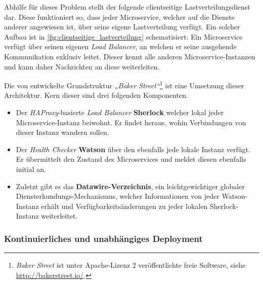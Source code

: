 Abhilfe für dieses Problem stellt der folgende clientseitige Lastverteilungsdienst dar. Diese funktioniert so, dass jeder Microservice, welcher auf die Dienste anderer angewiesen ist, über seine eigene Lastverteilung verfügt. Ein solcher Aufbau ist in \autoref{fig:clientseitige_lastverteilung} schematisiert: Ein Microservice verfügt über seinen eigenen \textit{Load Balancer}, an welchen er seine ausgehende Kommunikation exklusiv leitet. Dieser kennt alle anderen Microservice-Instanzen und kann daher Nachrichten an diese weiterleiten.

Die von \citeauthor{Li15} entwickelte Grundstruktur \textit{„Baker Street“}\footnote{\textit{Baker Street} ist unter Apache-Lizenz 2 veröffentlichte freie Software, siehe \url{http://bakerstreet.io/}.} ist eine Umsetzung dieser Architektur. Kern dieser sind drei folgenden Komponenten.

\begin{itemize}
	\item Der \textit{HAProxy}-basierte \textit{Load Balancer} \textbf{Sherlock} welcher lokal jeder Microservice-Instanz beiwohnt. Er findet heraus, wohin Verbindungen von dieser Instanz wandern sollen.
	
	\item Der \textit{Health Checker} \textbf{Watson} über den ebenfalls jede lokale Instanz verfügt. Er übermittelt den Zustand des Microservices und meldet diesen ebenfalls initial an.
	
	\item Zuletzt gibt es das \textbf{Datawire-Verzeichnis}, ein leichtgewichtiger globaler Diensterkundungs-Mechanismus, welcher Informationen von jeder Watson-Instanz erhält und Verfügbarkeitsänderungen zu jeder lokalen Sherlock-Instanz weiterleitet.
\end{itemize}

\subsubsection{Kontinuierliches und unabhängiges Deployment}